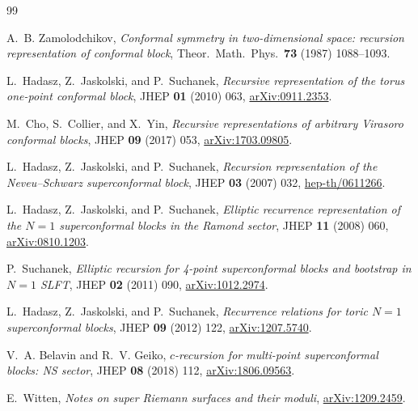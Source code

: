 \documentclass[11pt]{article}
\begin{document}
\begin{thebibliography}{99}

A.~B. Zamolodchikov,
\emph{Conformal symmetry in two-dimensional space: recursion representation
of conformal block},
Theor.\ Math.\ Phys.\ \textbf{73} (1987) 1088--1093.

L.~Hadasz, Z.~Jaskolski, and P.~Suchanek,
\emph{Recursive representation of the torus one-point conformal block},
JHEP \textbf{01} (2010) 063,
\href{https://arxiv.org/abs/0911.2353}{arXiv:0911.2353}.

M.~Cho, S.~Collier, and X.~Yin,
\emph{Recursive representations of arbitrary Virasoro conformal blocks},
JHEP \textbf{09} (2017) 053,
\href{https://arxiv.org/abs/1703.09805}{arXiv:1703.09805}.

L.~Hadasz, Z.~Jaskolski, and P.~Suchanek,
\emph{Recursion representation of the Neveu--Schwarz superconformal block},
JHEP \textbf{03} (2007) 032,
\href{https://arxiv.org/abs/hep-th/0611266}{hep-th/0611266}.

L.~Hadasz, Z.~Jaskolski, and P.~Suchanek,
\emph{Elliptic recurrence representation of the \(N=1\) superconformal
blocks in the Ramond sector},
JHEP \textbf{11} (2008) 060,
\href{https://arxiv.org/abs/0810.1203}{arXiv:0810.1203}.

P.~Suchanek,
\emph{Elliptic recursion for 4-point superconformal blocks and bootstrap in
\(N=1\) SLFT},
JHEP \textbf{02} (2011) 090,
\href{https://arxiv.org/abs/1012.2974}{arXiv:1012.2974}.

L.~Hadasz, Z.~Jaskolski, and P.~Suchanek,
\emph{Recurrence relations for toric \(N=1\) superconformal blocks},
JHEP \textbf{09} (2012) 122,
\href{https://arxiv.org/abs/1207.5740}{arXiv:1207.5740}.

V.~A. Belavin and R.~V. Geiko,
\emph{\(c\)-recursion for multi-point superconformal blocks: NS sector},
JHEP \textbf{08} (2018) 112,
\href{https://arxiv.org/abs/1806.09563}{arXiv:1806.09563}.

E.~Witten,
\emph{Notes on super Riemann surfaces and their moduli},
\href{https://arxiv.org/abs/1209.2459}{arXiv:1209.2459}.

\end{thebibliography}
\end{document}
